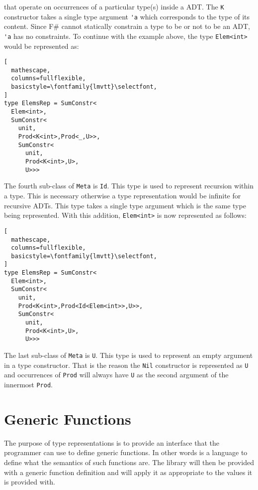 \documentclass{sigplanconf}
\begin{document}
that operate on occurrences of a particular type(s) inside a ADT. The
\verb+K+ constructor takes a single type argument \verb+'a+ which
corresponds to the type of its content. Since F\# cannot statically
constrain a type to be or not to be an ADT, \verb+'a+ has no
constraints. To continue with the example above, the type
\verb+Elem<int>+ would be represented as:
\begin{lstlisting}[
  mathescape,
  columns=fullflexible,
  basicstyle=\fontfamily{lmvtt}\selectfont,
]
type ElemsRep = SumConstr<
  Elem<int>,
  SumConstr<
    unit,
    Prod<K<int>,Prod<_,U>>,
    SumConstr<
      unit,
      Prod<K<int>,U>,
      U>>>
\end{lstlisting}
The fourth sub-class of \verb+Meta+ is \verb+Id+. This type is used to
represent recursion within a type. This is necessary otherwise a type
representation would be infinite for recursive ADTs. This type takes a
single type argument which is the same type being
represented. With this addition, \verb+Elem<int>+ is now represented
as follows:
\begin{lstlisting}[
  mathescape,
  columns=fullflexible,
  basicstyle=\fontfamily{lmvtt}\selectfont,
]
type ElemsRep = SumConstr<
  Elem<int>,
  SumConstr<
    unit,
    Prod<K<int>,Prod<Id<Elem<int>>,U>>,
    SumConstr<
      unit,
      Prod<K<int>,U>,
      U>>>
\end{lstlisting}
The last sub-class of \verb+Meta+ is \verb+U+. This type is used to
represent an empty argument in a type constructor. That is the reason
the \verb+Nil+ constructor is represented as \verb+U+ and occurrences
of \verb+Prod+ will always have \verb+U+ as the second argument of the
innermost \verb+Prod+.
\section{Generic Functions}
\label{sec:generic-functions}
The purpose of type representations is to provide an interface that
the programmer can use to define generic functions. In other words is
a language to define what the semantics of such functions are. The
library will then be provided with a generic function definition and
will apply it as appropriate to the values it is provided with.
\end{document}
